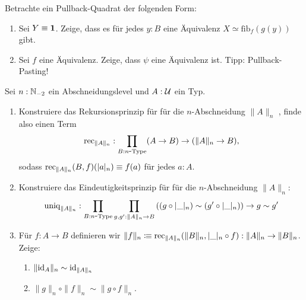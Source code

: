\documentclass{uebung}
\begin{document}

\begin{exercise}
  Betrachte ein Pullback-Quadrat der folgenden Form:
  \begin{center}
  \end{center}
  \begin{enumerate}
    \item Sei $Y\equiv\mathbf{1}$.
      Zeige, dass es für jedes $y:B$ eine Äquivalenz $X\simeq\mathrm{fib}_f(g(y))$ gibt.
    \item Sei $f$ eine Äquivalenz.
      Zeige, dass $\psi$ eine Äquivalenz ist.
      {\tiny Tipp: Pullback-Pasting!}
  \end{enumerate}
\end{exercise}

\begin{exercise}
  Sei $n:\mathbb{N}_{-2}$ ein Abschneidungslevel und $A:\mathcal{U}$ ein Typ.
  \begin{enumerate}
    \item Konstruiere das Rekursionsprinzip für für die $n$-Abschneidung $\|A\|_n$ , finde also einen Term
      $$
      \mathrm{rec}_{\|A\|_n}:\prod_{B:n\mbox{-}\mathrm{Type}}(A \to B) \to (\|A\|_n \to B),
      $$
      sodass $\mathrm{rec}_{\|A\|_n}(B,f)(|a|_n) \equiv f(a)$ für jedes $a:A$.
    \item Konstruiere das Eindeutigkeitsprinzip für für die $n$-Abschneidung $\|A\|_n$:
      $$
      \mathrm{uniq}_{\|A\|_n}:\prod_{B:n\mbox{-}\mathrm{Type}}\prod_{g,g':\|A\|_n \to B} \left((g\circ |\_|_n) \sim (g'\circ |\_|_n)\right) \to g \sim g'
      $$
    \item
  Für $f:A\to B$ definieren wir $\|f\|_n\vcentcolon\mspace{-1.2mu}\equiv \mathrm{rec}_{\|A\|_n}(\|B\|_n,|\_|_n\circ f):\|A\|_n\to\|B\|_n$.
  Zeige:
  \begin{enumerate}
    \item $\|\mathrm{id}_A\|_n\sim \mathrm{id}_{\|A\|_n}$
    \item $\|g\|_n\circ\|f\|_n\sim\|g \circ f\|_n$.
  \end{enumerate}
  \end{enumerate}
\end{exercise}
\end{document}
